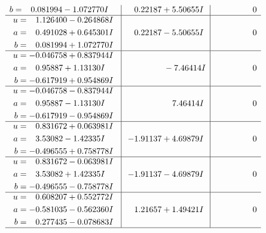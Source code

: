 \documentclass[1p]{elsarticle_modified}
\theoremstyle{definition}
\begin{document}
$$\begin{array}{c|c|c}
\begin{aligned}
b &= \phantom{-}0.081994 - 1.072770 I\end{aligned}
 & \phantom{-}0.22187 + 5.50655 I & \phantom{-0.000000 } 0 \\ \hline\begin{aligned}
u &= \phantom{-}1.126400 - 0.264868 I \\
a &= \phantom{-}0.491028 + 0.645301 I \\
b &= \phantom{-}0.081994 + 1.072770 I\end{aligned}
 & \phantom{-}0.22187 - 5.50655 I & \phantom{-0.000000 } 0 \\ \hline\begin{aligned}
u &= -0.046758 + 0.837944 I \\
a &= \phantom{-}0.95887 + 1.13130 I \\
b &= -0.617919 + 0.954869 I\end{aligned}
 & \phantom{-0.000000 } -7.46414 I & \phantom{-0.000000 } 0 \\ \hline\begin{aligned}
u &= -0.046758 - 0.837944 I \\
a &= \phantom{-}0.95887 - 1.13130 I \\
b &= -0.617919 - 0.954869 I\end{aligned}
 & \phantom{-0.000000 -}7.46414 I & \phantom{-0.000000 } 0 \\ \hline\begin{aligned}
u &= \phantom{-}0.831672 + 0.063981 I \\
a &= \phantom{-}3.53082 - 1.42335 I \\
b &= -0.496555 + 0.758778 I\end{aligned}
 & -1.91137 + 4.69879 I & \phantom{-0.000000 } 0 \\ \hline\begin{aligned}
u &= \phantom{-}0.831672 - 0.063981 I \\
a &= \phantom{-}3.53082 + 1.42335 I \\
b &= -0.496555 - 0.758778 I\end{aligned}
 & -1.91137 - 4.69879 I & \phantom{-0.000000 } 0 \\ \hline\begin{aligned}
u &= \phantom{-}0.608207 + 0.552772 I \\
a &= -0.581035 - 0.562360 I \\
b &= \phantom{-}0.277435 - 0.078683 I\end{aligned}
 & \phantom{-}1.21657 + 1.49421 I & \phantom{-0.000000 } 0\\
 \hline 

\end{array}$$
\end{document}
